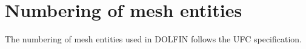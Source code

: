 \chapter{Numbering of mesh entities}

The numbering of mesh entities used in DOLFIN follows the
UFC specification.~\cite{www:UFC}

